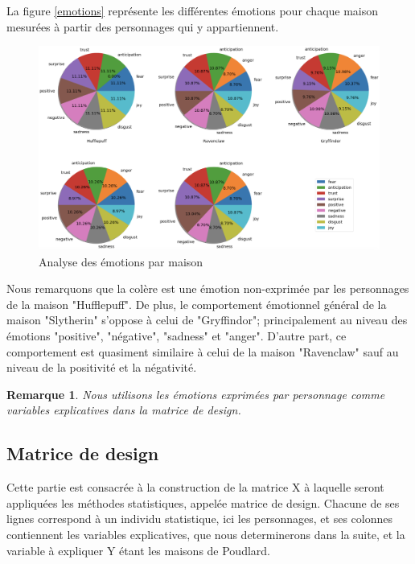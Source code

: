 \documentclass[11pt]{article}
\newtheorem*{remarque}{Remarque}
\begin{document}
La figure \autoref{emotions} représente les différentes émotions pour chaque maison mesurées à partir des personnages qui y appartiennent.

\begin{figure}[hbt!]
    \centering
    \includegraphics[width= 17 cm]{./figures/emotions_houses.png}
    \caption{Analyse des émotions par maison}
\end{figure}
\FloatBarrier

Nous remarquons que la colère est une émotion non-exprimée par les personnages de la maison "Hufflepuff". De plus, le comportement émotionnel général de la maison "Slytherin" s'oppose à celui de "Gryffindor"; principalement au niveau des émotions "positive", "négative", "sadness" et "anger". D'autre part, ce comportement est quasiment similaire à celui de la maison "Ravenclaw" sauf au niveau de la positivité et la négativité.\par

\begin{remarque}
    Nous utilisons les émotions exprimées par personnage comme variables explicatives dans la matrice de design.
\end{remarque}

\subsection{Matrice de design}

Cette partie est consacrée à la construction de la matrice {X} à laquelle seront appliquées les méthodes statistiques, appelée matrice de design. Chacune de ses lignes correspond à un individu statistique, ici les personnages, et ses colonnes contiennent les variables explicatives, que nous determinerons dans la suite, et la variable à expliquer {Y} étant les maisons de Poudlard.\par
\end{document}
